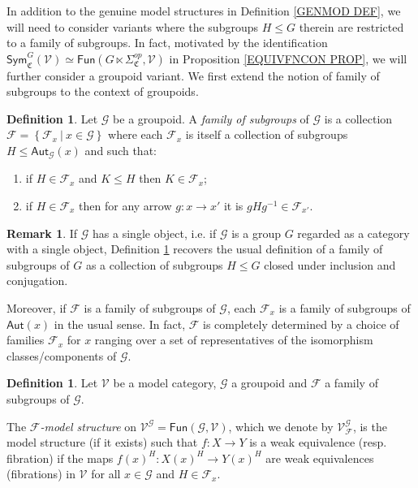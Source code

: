 \documentclass[a4paper,10pt
,draft
]{article}%
\numberwithin{equation}{section}
\numberwithin{figure}{section}
\theoremstyle{definition} %
\newtheorem{definition}[equation]{Definition}%
\newtheorem{remark}[equation]{Remark}%
\newcommand{\Fun}{\mathsf{Fun}}
\newcommand{\F}{\ensuremath{\mathcal F}}
\newcommand{\V}{\ensuremath{\mathcal V}}
\newcommand{\G}{\ensuremath{\mathcal G}}
\newcommand{\1}{\ensuremath{\mathbbm 1}}%
\begin{document}
In addition to the genuine model structures in 
Definition \ref{GENMOD DEF},
we will need to consider variants
where the subgroups $H\leq G$ therein are restricted to a family of subgroups.
In fact, motivated by the identification
$\mathsf{Sym}^G_{\mathfrak{C}}(\V) \simeq 
\mathsf{Fun}(G \ltimes \Sigma^{op}_{\mathfrak{C}},\V)$
in Proposition \ref{EQUIVFNCON PROP},
we will further consider a groupoid variant.
We first extend the notion of family of subgroups to the context of groupoids.


\begin{definition}\label{FAMGROUPOID DEF}
Let $\G$ be a groupoid.
A \textit{family of subgroups} of $\G$
is a collection 
$\mathcal{F} = \left\{\mathcal{F}_x\ | \ x\in \G\right\}$
where each $\F_x$ is itself a collection of subgroups
$H \leq \mathsf{Aut}_{\mathcal{G}}(x)$ and such that:
\begin{enumerate}[label = (\roman*)]
\item if $H \in \F_x$ and $K \leq H$ then $K \in \mathcal{F}_x$;
\item if $H \in \mathcal{F}_x$
then for any arrow $g \colon x \to x'$
it is $g H g^{-1} \in \mathcal{F}_{x'}$.
\end{enumerate}
\end{definition}


\begin{remark}
If $\G$ has a single object, i.e. if $\G$ is a group $G$ regarded as a category with a single object, Definition \ref{FAMGROUPOID DEF} recovers the usual definition of a family of subgroups of $G$ as a collection of subgroups $H\leq G$ closed under inclusion and conjugation.

Moreover, if $\F$ is a family of subgroups of $\G$, each $\F_x$ is a family of subgroups of $\mathsf{Aut}(x)$ in the usual sense. 
In fact, $\mathcal{F}$ is completely determined by a choice of families
$\F_x$ for $x$ ranging over a set of representatives of the isomorphism classes/components of $\G$.
\end{remark}



\begin{definition}
	Let $\V$ be a model category, $\G$ a groupoid and 
	$\F$ a family of subgroups of $\G$.

	The \textit{$\F$-model structure} on $\V^\G = \Fun(\G, \V)$, 
	which we denote by $\V^\G_\F$,
	is the model structure (if it exists)
	such that 
	$f\colon X \to Y$
	is a weak equivalence (resp. fibration)
	if the maps $f(x)^H \colon X(x)^H \to Y(x)^H$ are weak equivalences (fibrations) in $\V$ for all $x \in \G$ and $H \in \F_x$.
\end{definition}
\end{document}
